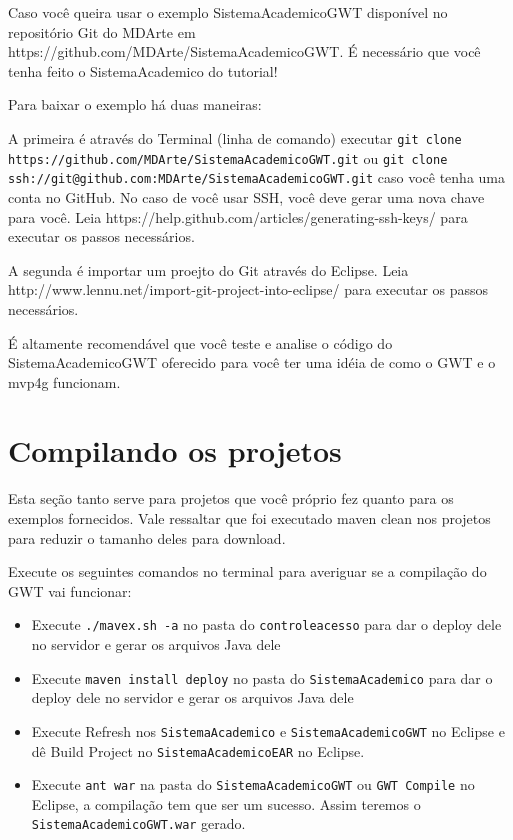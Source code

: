 Caso você queira usar o exemplo SistemaAcademicoGWT disponível no repositório Git do MDArte em
https://github.com/MDArte/SistemaAcademicoGWT. É necessário que você tenha feito o SistemaAcademico do tutorial!

Para baixar o exemplo há duas maneiras:

A primeira é através do Terminal (linha de comando) executar \texttt{git clone https://github.com/MDArte/SistemaAcademicoGWT.git}
ou \texttt{git clone ssh://git@github.com:MDArte/SistemaAcademicoGWT.git} caso você tenha uma conta no GitHub. No caso de você usar SSH, você deve
gerar uma nova chave para você. Leia https://help.github.com/articles/generating-ssh-keys/ para executar os passos necessários.

A segunda é importar um proejto do Git através do Eclipse. Leia http://www.lennu.net/import-git-project-into-eclipse/ para
executar os passos necessários.

É altamente recomendável que você teste e analise o código do SistemaAcademicoGWT oferecido para você ter uma idéia de como o GWT
e o mvp4g funcionam.

\section{Compilando os projetos}

Esta seção tanto serve para projetos que você próprio fez quanto para os exemplos fornecidos. Vale ressaltar que foi executado
maven clean nos projetos para reduzir o tamanho deles para download. 

Execute os seguintes comandos no terminal para averiguar se a compilação do GWT vai funcionar:

\begin{itemize}
  \item Execute \texttt{./mavex.sh -a} no pasta do \texttt{controleacesso} para dar o deploy dele no servidor e gerar os arquivos
  Java dele
  \item Execute \texttt{maven install deploy} no pasta do \texttt{SistemaAcademico} para dar o deploy dele no servidor e gerar os
  arquivos Java dele
  \item Execute Refresh nos \texttt{SistemaAcademico} e \texttt{SistemaAcademicoGWT} no Eclipse e dê Build Project no
  \texttt{SistemaAcademicoEAR} no Eclipse.
  \item Execute \texttt{ant war} na pasta do \texttt{SistemaAcademicoGWT} ou \texttt{GWT Compile} no Eclipse, a compilação tem que
  ser um sucesso.
  Assim teremos o \texttt{SistemaAcademicoGWT.war} gerado.
\end{itemize}

